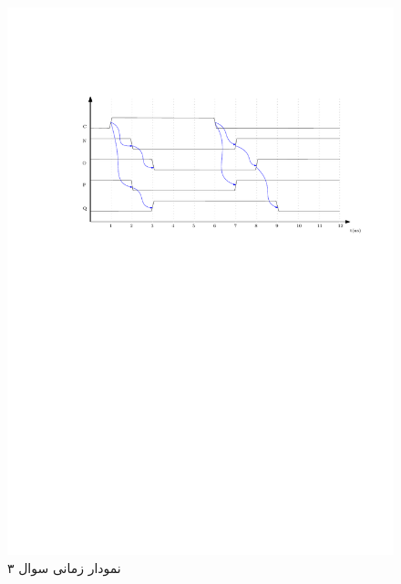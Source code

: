 

\begin{figure}[h!]
	\centering
	\includegraphics[width=1\textwidth]{fig/Q3.pdf}
	\caption{نمودار زمانی سوال ۳}
	\label{Q3_Design}
\end{figure}